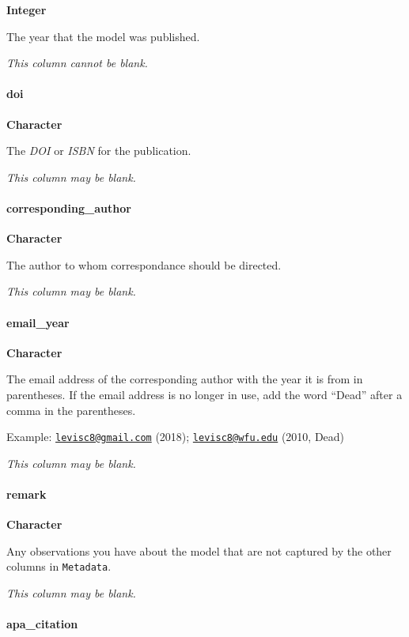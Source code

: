 \documentclass[]{article}
\let\oldparagraph\paragraph
\renewcommand{\paragraph}[1]{\oldparagraph{#1}\mbox{}}
\begin{document}
\textbf{Integer}

The year that the model was published.

\emph{This column cannot be blank.}

\paragraph{doi}\label{doi}

\textbf{Character}

The \emph{DOI} or \emph{ISBN} for the publication.

\emph{This column may be blank.}

\paragraph{corresponding\_author}\label{corresponding_author}

\textbf{Character}

The author to whom correspondance should be directed.

\emph{This column may be blank.}

\paragraph{email\_year}\label{email_year}

\textbf{Character}

The email address of the corresponding author with the year it is from
in parentheses. If the email address is no longer in use, add the word
``Dead'' after a comma in the parentheses.

Example: \href{mailto:levisc8@gmail.com}{\nolinkurl{levisc8@gmail.com}}
(2018); \href{mailto:levisc8@wfu.edu}{\nolinkurl{levisc8@wfu.edu}}
(2010, Dead)

\emph{This column may be blank.}

\paragraph{remark}\label{remark}

\textbf{Character}

Any observations you have about the model that are not captured by the
other columns in \texttt{Metadata}.

\emph{This column may be blank.}

\paragraph{apa\_citation}\label{apa_citation}
\end{document}
